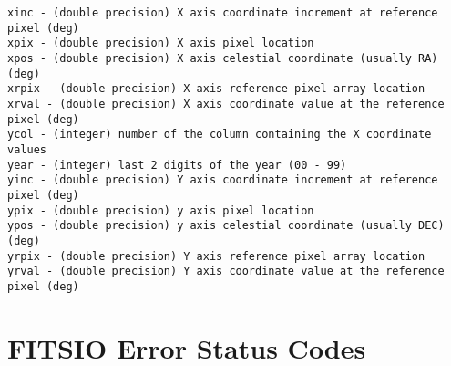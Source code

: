 \documentclass[11pt]{book}
\begin{document}
\begin{verbatim}
xinc - (double precision) X axis coordinate increment at reference pixel (deg)
xpix - (double precision) X axis pixel location
xpos - (double precision) X axis celestial coordinate (usually RA) (deg)
xrpix - (double precision) X axis reference pixel array location
xrval - (double precision) X axis coordinate value at the reference pixel (deg)
ycol - (integer) number of the column containing the X coordinate values
year - (integer) last 2 digits of the year (00 - 99)
yinc - (double precision) Y axis coordinate increment at reference pixel (deg)
ypix - (double precision) y axis pixel location
ypos - (double precision) y axis celestial coordinate (usually DEC) (deg)
yrpix - (double precision) Y axis reference pixel array location
yrval - (double precision) Y axis coordinate value at the reference pixel (deg)
\end{verbatim}

\chapter{   FITSIO Error Status Codes }
\end{document}
